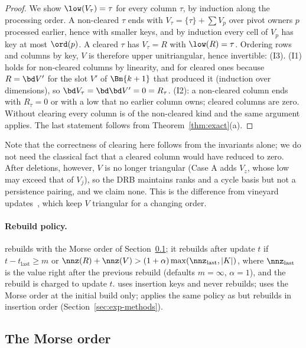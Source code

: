 \begin{proof}
We show $\low(V_\tau)=\tau$ for every column $\tau$, by induction along the
processing order. A non-cleared $\tau$ ends with
$V_\tau=\{\tau\}+\sum V_p$ over pivot owners $p$ processed earlier, hence with
smaller keys, and by induction every cell of $V_p$ has key at most $\ord(p)$. A
cleared $\tau$ has $V_\tau=R$ with $\low(R)=\tau$. Ordering rows and columns by
key, $V$ is therefore upper unitriangular, hence invertible: (I3). (I1) holds
for non-cleared columns by linearity, and for cleared ones because $R=\bd V'$
for the slot $V'$ of $\Bm{k+1}$ that produced it (induction over dimensions), so
$\bd V_\tau=\bd\bd V'=0=R_\tau$. (I2): a non-cleared column ends with $R_\tau=0$ or
with a low that no earlier column owns; cleared columns are zero. Without
clearing every column is of the non-cleared kind and the same argument applies.
The last statement follows from Theorem~\ref{thm:exact}(a).
\end{proof}

Note that the correctness of clearing here follows from the invariants alone;
we do not need the classical fact that a cleared column would have reduced to
zero. After deletions, however, $V$ is no longer triangular (Case A adds
$V_z$, whose low may exceed that of $V_j$), so the DRB maintains ranks and a cycle
basis but not a persistence pairing, and we claim none. This is the difference
from vineyard updates~\cite{cohensteiner2006vines}, which keep $V$ triangular
for a changing order.

\paragraph{Rebuild policy.}  rebuilds with the Morse order of Section~\ref{sec:morse}; it
rebuilds after update $t$ if $t-t_{\mathrm{last}}\ge m$ or
$\nnz(R)+\nnz(V)>(1+\alpha)\max(\nnz_{\mathrm{last}},|K|)$, where
$\nnz_{\mathrm{last}}$ is the value right after the previous rebuild (defaults
$m=\infty$, $\alpha=1$), and the rebuild is charged to update $t$.
 uses insertion keys and never rebuilds;  uses
the Morse order at the initial build only;  applies the same
policy as  but rebuilds in insertion order
(Section~\ref{sec:exp-methods}).

\subsection{The Morse order}\label{sec:morse}

